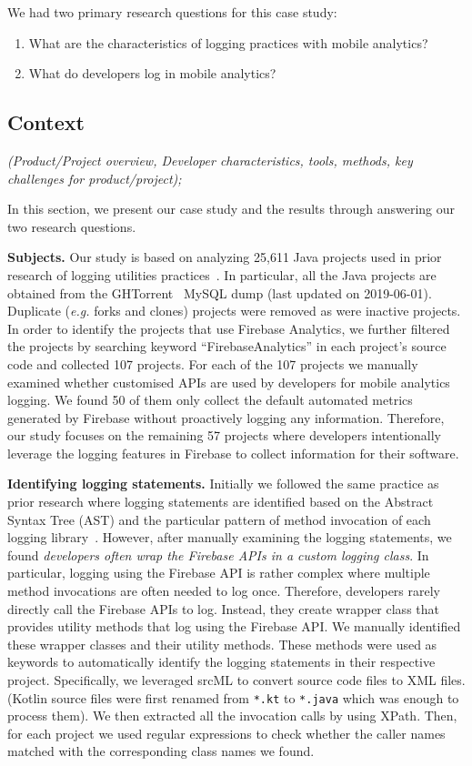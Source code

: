 We had two primary research questions for this case study:
\begin{enumerate}
    \item What are the characteristics of logging practices with mobile analytics?
    \item What do developers log in mobile analytics?
\end{enumerate}


\subsection{Context}
\emph{(Product/Project overview, Developer characteristics, tools, methods, key challenges for product/project);}

In this section, we present our case study and the results through answering our two research questions.

\noindent \textbf{Subjects.} Our study is based on analyzing 25,611 Java projects used in prior research of logging utilities practices~\cite{boyuanlogutility}. In particular, all the Java projects are obtained from the GHTorrent~\cite{10.5555/2664446.2664449} MySQL dump  (last updated on 2019-06-01). Duplicate (\textit{e.g.} forks and clones) projects were removed as were inactive projects. In order to identify the projects that use Firebase Analytics, we further filtered the projects by searching keyword ``FirebaseAnalytics'' in each project's source code and collected 107 projects. For each of the 107 projects we manually examined whether customised APIs are used by developers for mobile analytics logging. We found 50 of them only collect the default automated metrics generated by Firebase without proactively logging any information. Therefore, our study focuses on the remaining 57 projects where developers intentionally leverage the logging features in Firebase to collect information for their software.

\noindent \textbf{Identifying logging statements.} Initially we followed the same practice as prior research where logging statements are identified based on the Abstract Syntax Tree (AST) and the particular pattern of method invocation of each logging library~\cite{yizengemse,chen2017characterizing}. 
%
However, after manually examining the logging statements, we found \emph{developers often wrap the Firebase APIs in a custom logging class}. In particular, logging using the Firebase API is rather complex where multiple method invocations are often needed to 
log once. Therefore, developers rarely directly call the Firebase APIs to log. Instead, they create wrapper class that provides utility methods that log using the Firebase API.
We manually identified these wrapper classes and their utility methods. These methods were used as keywords to automatically identify the logging statements in their respective project.
%
Specifically, we leveraged srcML to convert source code files to XML files. (Kotlin source files were first renamed from \texttt{*.kt} to \texttt{*.java} which was enough to process them). We then extracted all the invocation calls by using XPath. Then, for each project we used regular expressions to check whether the caller names matched with the corresponding class names we found.


